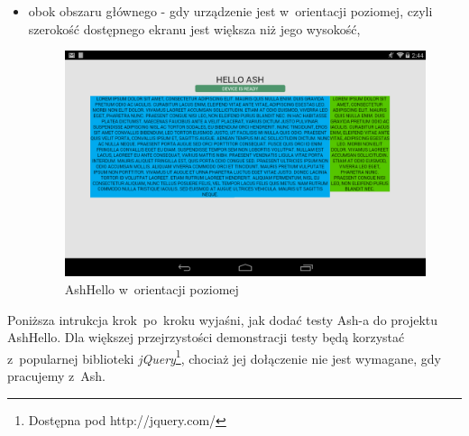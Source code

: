 \documentclass[brudnopis]{xmgr}
\begin{document}
\begin{itemize}
  \item obok obszaru głównego - gdy urządzenie jest w~orientacji poziomej, czyli szerokość dostępnego ekranu jest większa niż jego wysokość,

\begin{figure}[h]
    \centering
    \includegraphics[scale=0.25]{hello2.png}
    \caption{AshHello w~orientacji poziomej}
    \label{fig:AshHello2}
\end{figure}
\end{itemize}

Poniższa intrukcja krok~po~kroku wyjaśni, jak dodać testy Ash-a do projektu AshHello. Dla większej przejrzystości demonstracji testy będą korzystać z~popularnej biblioteki \textit{jQuery}\footnote{Dostępna pod http://jquery.com/}, chociaż jej dołączenie nie jest wymagane, gdy pracujemy z~Ash.  
\end{document}
